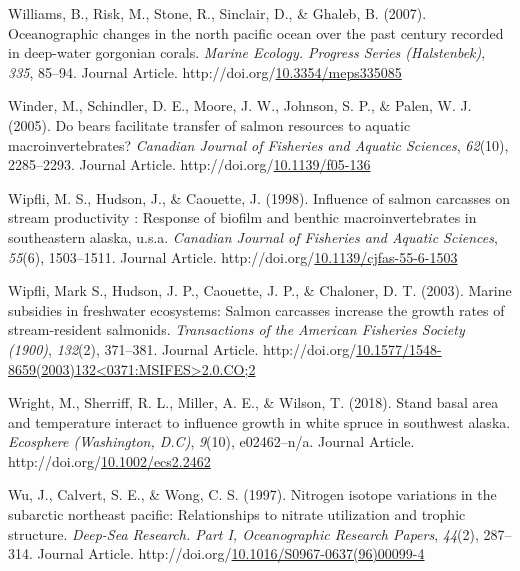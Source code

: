 \documentclass [11pt, proquest] {uwthesis}[2015/03/03]
\newlength{\cslhangindent}
\newenvironment{CSLReferences}%
{\setlength{\parindent}{0pt}%
\everypar{\setlength{\hangindent}{\cslhangindent}}\ignorespaces}%
{\par}
\begin{document}
\begin{CSLReferences}{1}{0}
\leavevmode\hypertarget{ref-Williams2007}{}%
Williams, B., Risk, M., Stone, R., Sinclair, D., \& Ghaleb, B. (2007). Oceanographic changes in the north pacific ocean over the past century recorded in deep-water gorgonian corals. \emph{Marine Ecology. Progress Series (Halstenbek)}, \emph{335}, 85--94. Journal Article. http://doi.org/\href{https://doi.org/10.3354/meps335085}{10.3354/meps335085}

\leavevmode\hypertarget{ref-Winder2005}{}%
Winder, M., Schindler, D. E., Moore, J. W., Johnson, S. P., \& Palen, W. J. (2005). Do bears facilitate transfer of salmon resources to aquatic macroinvertebrates? \emph{Canadian Journal of Fisheries and Aquatic Sciences}, \emph{62}(10), 2285--2293. Journal Article. http://doi.org/\href{https://doi.org/10.1139/f05-136}{10.1139/f05-136}

\leavevmode\hypertarget{ref-Wipfli1998}{}%
Wipfli, M. S., Hudson, J., \& Caouette, J. (1998). Influence of salmon carcasses on stream productivity : Response of biofilm and benthic macroinvertebrates in southeastern alaska, u.s.a. \emph{Canadian Journal of Fisheries and Aquatic Sciences}, \emph{55}(6), 1503--1511. Journal Article. http://doi.org/\href{https://doi.org/10.1139/cjfas-55-6-1503}{10.1139/cjfas-55-6-1503}

\leavevmode\hypertarget{ref-Wipfli2003}{}%
Wipfli, Mark S., Hudson, J. P., Caouette, J. P., \& Chaloner, D. T. (2003). Marine subsidies in freshwater ecosystems: Salmon carcasses increase the growth rates of stream‐resident salmonids. \emph{Transactions of the American Fisheries Society (1900)}, \emph{132}(2), 371--381. Journal Article. http://doi.org/\href{https://doi.org/10.1577/1548-8659(2003)132\%3C0371:MSIFES\%3E2.0.CO;2}{10.1577/1548-8659(2003)132\textless0371:MSIFES\textgreater2.0.CO;2}

\leavevmode\hypertarget{ref-Wright2018}{}%
Wright, M., Sherriff, R. L., Miller, A. E., \& Wilson, T. (2018). Stand basal area and temperature interact to influence growth in white spruce in southwest alaska. \emph{Ecosphere (Washington, D.C)}, \emph{9}(10), e02462--n/a. Journal Article. http://doi.org/\href{https://doi.org/10.1002/ecs2.2462}{10.1002/ecs2.2462}

\leavevmode\hypertarget{ref-Wu1997}{}%
Wu, J., Calvert, S. E., \& Wong, C. S. (1997). Nitrogen isotope variations in the subarctic northeast pacific: Relationships to nitrate utilization and trophic structure. \emph{Deep-Sea Research. Part I, Oceanographic Research Papers}, \emph{44}(2), 287--314. Journal Article. http://doi.org/\href{https://doi.org/10.1016/S0967-0637(96)00099-4}{10.1016/S0967-0637(96)00099-4}


\end{CSLReferences}
\end{document}
